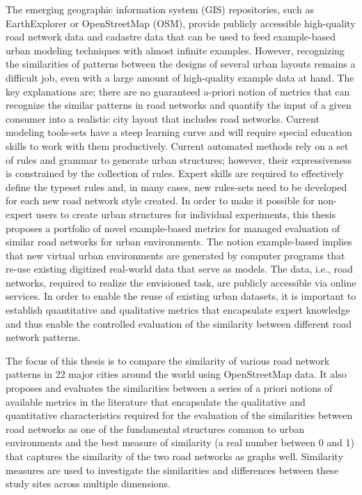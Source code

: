 
The emerging geographic information system (GIS) repositories, such as EarthExplorer or OpenStreetMap (OSM), provide publicly accessible high-quality road network data and cadastre data that can be used to feed example-based urban modeling techniques with almost infinite examples. However, recognizing the similarities of patterns between the designs of several urban layouts remains a difficult job, even with a large amount of high-quality example data at hand. The key explanations are;  there are no guaranteed a-priori notion of metrics that can recognize the similar patterns in road networks and quantify the input of a given consumer into a realistic city layout that includes road networks.  Current modeling tools-sets have a steep learning curve and will require special education skills to work with them productively. Current automated methods rely on a set of rules and grammar to generate urban structures; however, their expressiveness is constrained by the collection of rules. Expert skills are required to effectively define the typeset rules and, in many cases, new rules-sets need to be developed for each new road network style created. In order to make it possible for non-expert users to create urban structures for individual experiments, this thesis proposes a portfolio of novel example-based metrics for managed evaluation of similar road networks for urban environments. The notion example-based implies that new virtual urban environments are generated by computer programs that re-use existing digitized real-world data that serve as models. The data, i.e., road networks, required to realize the envisioned task, are publicly accessible via online services. In order to enable the reuse of existing urban datasets, it is important to establish quantitative and qualitative metrics that encapsulate expert knowledge and thus enable the controlled evaluation of the similarity between different road network patterns.  

The focus of this thesis is to compare the similarity of various road network patterns in 22 major cities around the world using OpenStreetMap data. It also proposes and evaluates the similarities between a series of a priori notions of available metrics in the literature that encapsulate the qualitative and quantitative characteristics required for the evaluation of the similarities between road networks as one of the fundamental structures common to urban environments and the best measure of similarity (a real number between 0 and 1) that captures the similarity of the two road networks as graphs well. Similarity measures are used to investigate the similarities and differences between these study sites across multiple dimensions.

